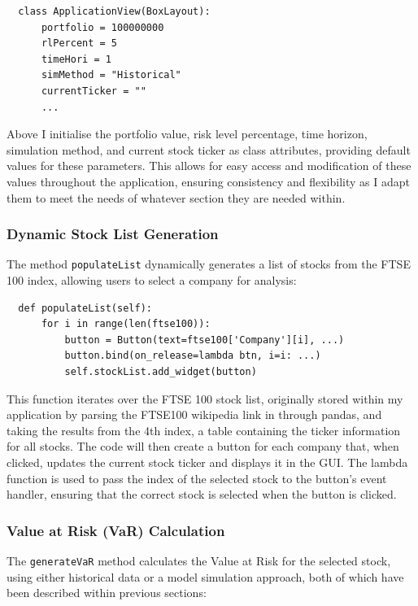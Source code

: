 \documentclass{article}
\begin{document}
\begin{verbatim}
  class ApplicationView(BoxLayout):
      portfolio = 100000000
      rlPercent = 5
      timeHori = 1
      simMethod = "Historical"
      currentTicker = ""
      ...
\end{verbatim}

\vspace{0.3cm}
Above I initialise the portfolio value, risk level percentage, time horizon, simulation method, and current stock ticker as class attributes, providing default values for these parameters. This allows for easy access and modification of these values throughout the application, ensuring consistency and flexibility as I adapt them to meet the needs of whatever section they are needed within.\\\vspace{0.3cm}

\subsubsection{Dynamic Stock List Generation}
The method \texttt{populateList} dynamically generates a list of stocks from the FTSE 100 index, allowing users to select a company for analysis:

\begin{verbatim}
  def populateList(self):
      for i in range(len(ftse100)):
          button = Button(text=ftse100['Company'][i], ...)
          button.bind(on_release=lambda btn, i=i: ...)
          self.stockList.add_widget(button)
\end{verbatim}

\vspace{0.3cm}
This function iterates over the FTSE 100 stock list, originally stored within my application by parsing the FTSE100 wikipedia link in through pandas, and taking the results from the 4th index, a table containing the ticker information for all stocks. The code will then create a button for each company that, when clicked, updates the current stock ticker and displays it in the GUI. The lambda function is used to pass the index of the selected stock to the button's event handler, ensuring that the correct stock is selected when the button is clicked.\\\vspace{0.3cm}

\subsubsection{Value at Risk (VaR) Calculation}
The \texttt{generateVaR} method calculates the Value at Risk for the selected stock, using either historical data or a model simulation approach, both of which have been described within previous sections:
\end{document}
